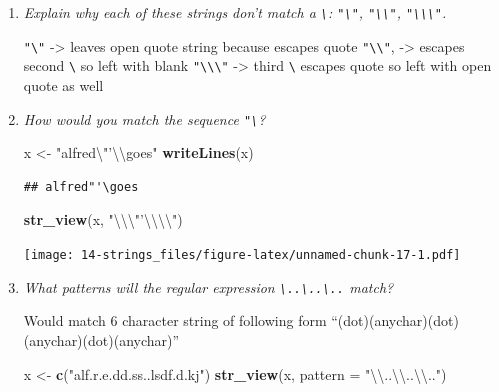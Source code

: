 \documentclass[]{book}
\newenvironment{Shaded}{\begin{snugshade}}{\end{snugshade}}
\newcommand{\CharTok}[1]{\textcolor[rgb]{0.31,0.60,0.02}{#1}}
\newcommand{\DataTypeTok}[1]{\textcolor[rgb]{0.13,0.29,0.53}{#1}}
\newcommand{\KeywordTok}[1]{\textcolor[rgb]{0.13,0.29,0.53}{\textbf{#1}}}
\newcommand{\NormalTok}[1]{#1}
\newcommand{\StringTok}[1]{\textcolor[rgb]{0.31,0.60,0.02}{#1}}
\theoremstyle{definition}
\theoremstyle{definition}
\theoremstyle{definition}
\theoremstyle{remark}
\begin{document}
\begin{enumerate}
\def\labelenumi{\arabic{enumi}.}
\item
  \emph{Explain why each of these strings don't match a
  \texttt{\textbackslash{}}: \texttt{"\textbackslash{}"},
  \texttt{"\textbackslash{}\textbackslash{}"},
  \texttt{"\textbackslash{}\textbackslash{}\textbackslash{}"}.}

  \texttt{"\textbackslash{}"} -\textgreater{} leaves open quote string
  because escapes quote \texttt{"\textbackslash{}\textbackslash{}"},
  -\textgreater{} escapes second \texttt{\textbackslash{}} so left with
  blank \texttt{"\textbackslash{}\textbackslash{}\textbackslash{}"}
  -\textgreater{} third \texttt{\textbackslash{}} escapes quote so left
  with open quote as well
\item
  \emph{How would you match the sequence
  \texttt{"\textquotesingle{}\textbackslash{}}?}

\begin{Shaded}
\begin{Highlighting}[]
\NormalTok{x <-}\StringTok{ "alfred}\CharTok{\textbackslash{}"}\StringTok{'}\CharTok{\textbackslash{}\textbackslash{}}\StringTok{goes"}
\KeywordTok{writeLines}\NormalTok{(x)}
\end{Highlighting}
\end{Shaded}

\begin{verbatim}
## alfred"'\goes
\end{verbatim}

\begin{Shaded}
\begin{Highlighting}[]
\KeywordTok{str_view}\NormalTok{(x, }\StringTok{"}\CharTok{\textbackslash{}\textbackslash{}\textbackslash{}"}\StringTok{'}\CharTok{\textbackslash{}\textbackslash{}\textbackslash{}\textbackslash{}}\StringTok{"}\NormalTok{)}
\end{Highlighting}
\end{Shaded}

  \texttt{[image: 14-strings\_files/figure-latex/unnamed-chunk-17-1.pdf]}
\item
  \emph{What patterns will the regular expression
  \texttt{\textbackslash{}..\textbackslash{}..\textbackslash{}..} match?
  }

  Would match 6 character string of following form
  ``(dot)(anychar)(dot)(anychar)(dot)(anychar)''

\begin{Shaded}
\begin{Highlighting}[]
\NormalTok{x <-}\StringTok{ }\KeywordTok{c}\NormalTok{(}\StringTok{"alf.r.e.dd.ss..lsdf.d.kj"}\NormalTok{)}
\KeywordTok{str_view}\NormalTok{(x, }\DataTypeTok{pattern =} \StringTok{"}\CharTok{\textbackslash{}\textbackslash{}}\StringTok{..}\CharTok{\textbackslash{}\textbackslash{}}\StringTok{..}\CharTok{\textbackslash{}\textbackslash{}}\StringTok{.."}\NormalTok{)}
\end{Highlighting}
\end{Shaded}


\end{enumerate}
\end{document}
